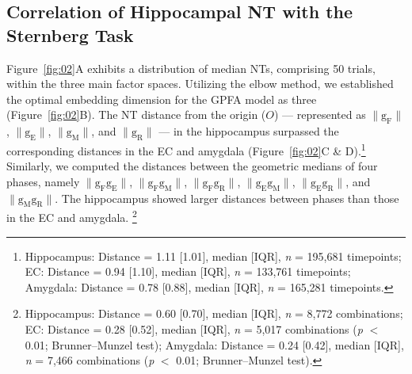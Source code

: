 \documentclass[preprint,review,12pt]{elsarticle}%
\begin{document}
\subsection{Correlation of Hippocampal NT with the Sternberg Task}
Figure~\ref{fig:02}A exhibits a distribution of median NTs, comprising 50 trials, within the three main factor spaces. Utilizing the elbow method, we established the optimal embedding dimension for the GPFA model as three (Figure~\ref{fig:02}B). The NT distance from the origin ($O$) --- represented as $\mathrm{\lVert g_{F} \rVert}$, $\mathrm{\lVert g_{E} \rVert}$, $\mathrm{\lVert g_{M} \rVert}$, and $\mathrm{\lVert g_{R} \rVert}$ --- in the hippocampus surpassed the corresponding distances in the EC and amygdala (Figure~\ref{fig:02}C \& D).\footnote{Hippocampus: Distance = 1.11 [1.01], median [IQR], \textit{n} = 195,681 timepoints; EC: Distance = 0.94 [1.10], median [IQR], \textit{n} = 133,761 timepoints; Amygdala: Distance = 0.78 [0.88], median [IQR], \textit{n} = 165,281 timepoints.}
\\
\indent
Similarly, we computed the distances between the geometric medians of four phases, namely $\mathrm{\lVert g_{F}g_{E} \rVert}$, $\mathrm{\lVert g_{F}g_{M} \rVert}$, $\mathrm{\lVert g_{F}g_{R} \rVert}$, $\mathrm{\lVert g_{E}g_{M} \rVert}$, $\mathrm{\lVert g_{E}g_{R} \rVert}$, and $\mathrm{\lVert g_{M}g_{R} \rVert}$. The hippocampus showed larger distances between phases than those in the EC and amygdala. \footnote{Hippocampus: Distance = 0.60 [0.70], median [IQR], \textit{n} = 8,772 combinations; EC: Distance = 0.28 [0.52], median [IQR], \textit{n} = 5,017 combinations (\textit{p} $<$ 0.01; Brunner--Munzel test); Amygdala: Distance = 0.24 [0.42], median [IQR], \textit{n} = 7,466 combinations (\textit{p} $<$ 0.01; Brunner--Munzel test).}
\end{document}
